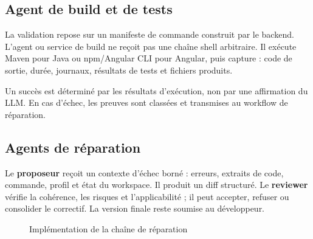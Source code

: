 \subsection{Agent de build et de tests}

La validation repose sur un manifeste de commande construit par le backend. L'agent ou service de build ne reçoit pas une chaîne shell arbitraire. Il exécute Maven pour Java ou npm/Angular CLI pour Angular, puis capture : code de sortie, durée, journaux, résultats de tests et fichiers produits.

Un succès est déterminé par les résultats d'exécution, non par une affirmation du LLM. En cas d'échec, les preuves sont classées et transmises au workflow de réparation.

\subsection{Agents de réparation}

Le \textbf{proposeur} reçoit un contexte d'échec borné : erreurs, extraits de code, commande, profil et état du workspace. Il produit un diff structuré. Le \textbf{reviewer} vérifie la cohérence, les risques et l'applicabilité ; il peut accepter, refuser ou consolider le correctif. La version finale reste soumise au développeur.

\begin{figure}[H]
    \centering
    \caption{Implémentation de la chaîne de réparation}
    \label{fig:implementation-reparation-ch4}
\end{figure}

